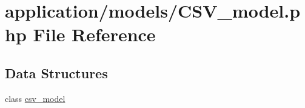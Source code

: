 \hypertarget{_c_s_v__model_8php}{}\section{application/models/\+C\+S\+V\+\_\+model.php File Reference}
\label{_c_s_v__model_8php}
\subsection*{Data Structures}
\begin{DoxyCompactItemize}
\item 
class \mbox{\hyperlink{classcsv__model}{csv\+\_\+model}}
\end{DoxyCompactItemize}
